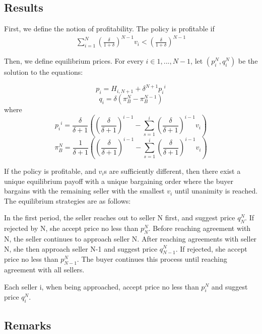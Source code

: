 \documentclass[ProjectGAZ]{subfiles}
\begin{document}
\subsection{Results}\label{subsec:Xiao-Results}

First, we define the notion of profitability. The policy is profitable if 
\begin{align}
	\sum_{i=1}^{N} (\frac{\delta}{1+\delta})^{N-1} v_i < (\frac{\delta}{1+\delta})^{N-1} \label{eq:XiaoProfitable}
\end{align}

Then, we define equilibrium prices. For every $i \in {1, ..., N-1}$, let $(p_i^N, q_i^N)$ be the solution to the equations:

\begin{equation}
	p_i = H_{i, N+1} + \delta^{N+1}{p_i}^i 
\end{equation}
\begin{equation}
	q_i = \delta(\pi_B^{N} - \pi_B^{N-1})
\end{equation}
where 
\begin{equation}
	{p_i}^i = \frac{\delta}{\delta+1}((\frac{\delta}{\delta+1})^{i-1} - \sum_{s=1}^{i}(\frac{\delta}{\delta +1})^{i-1}v_i)
\end{equation}
\begin{equation}
	\pi_B^N = \frac{1}{\delta+1}((\frac{\delta}{\delta+1})^{i-1} - \sum_{s=1}^{i}(\frac{\delta}{\delta +1})^{i-1}v_i)
\end{equation}

If the policy is profitable, and $v_i$s are sufficiently different, then there exist a unique equilibrium payoff with a unique bargaining order where the buyer bargains with the remaining seller with the smallest $v_i$ until unanimity is reached. The equilibrium strategies are as follows:

In the first period, the seller reaches out to seller N first, and suggest price $q_N^N$. If rejected by N, she accept price no less than $p_N^N$. Before reaching agreement with N, the seller continues to approach seller N. After reaching agreements with seller N, she then approach seller N-1 and suggest price $q_{N-1}^N$. If rejected, she accept price no less than $p_{N-1}^N$. The buyer continues this process until reaching agreement with all sellers.

Each seller i, when being approached, accept price no less than $p_i^N$ and suggest price $q_i^N$.

\subsection{Remarks}\label{subsec:Xiao-Remarks}
\end{document}
